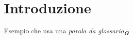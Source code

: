 


\section{Introduzione}

Esempio che usa una
\emph{parola da glossario}\textsubscript{\textit{\textbf{G}}}
